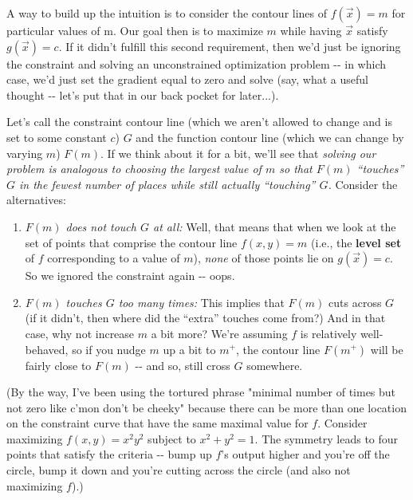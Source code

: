 \documentclass[letterpaper,12pt]{report}
\providecommand{\tightlist}{%
  \setlength{\itemsep}{0pt}\setlength{\parskip}{0pt}}
\begin{document}
A way to build up the intuition is to consider the contour lines of
\(f(\vec{x}) = m\) for particular values of m. Our goal then is to
maximize \(m\) while having \(\vec{x}\) satisfy \(g(\vec{x}) = c\). If
it didn't fulfill this second requirement, then we'd just be ignoring
the constraint and solving an unconstrained optimization problem -\/- in
which case, we'd just set the gradient equal to zero and solve (say,
what a useful thought -\/- let's put that in our back pocket for
later...).

Let's call the constraint contour line (which we aren't allowed to
change and is set to some constant \(c\)) \(G\) and the function contour
line (which we can change by varying \(m\)) \(F(m)\). If we think about
it for a bit, we'll see that \emph{solving our problem is analogous to
choosing the largest value of \(m\) so that \(F(m)\) ``touches'' \(G\) in
the fewest number of places while still actually ``touching'' \(G\).}
Consider the alternatives:

\begin{enumerate}
\tightlist
\item
  \emph{\(F(m)\) does not touch \(G\) at all:} Well, that means that
  when we look at the set of points that comprise the contour line
  \(f(x,y) = m\) (i.e., the \textbf{level set} 
   of \(f\) corresponding to
  a value of \(m\)), \emph{none} of those points lie on
  \(g(\vec{x}) = c\). So we ignored the constraint again -\/- oops.
\item
  \emph{\(F(m)\) touches \(G\) too many times:} This implies that
  \(F(m)\) cuts across \(G\) (if it didn't, then where did the ``extra''
  touches come from?) And in that case, why not increase \(m\) a bit
  more? We're assuming \(f\) is relatively well-behaved, so if you nudge
  \(m\) up a bit to \(m^+\), the contour line \(F(m^+)\) will be fairly
  close to \(F(m)\) -\/- and so, still cross \(G\) somewhere.
\end{enumerate}

(By the way, I've been using the tortured phrase "minimal number of
times but not zero like c'mon don't be cheeky" because there can be more
than one location on the constraint curve that have the same maximal
value for \(f\). Consider maximizing \(f(x,y) = x^2 y^2\) subject to
\(x^2 + y^2 = 1\). The symmetry leads to four points that satisfy the
criteria -\/- bump up \(f\)'s output higher and you're off the circle,
bump it down and you're cutting across the circle (and also not
maximizing \(f\)).)
\end{document}
